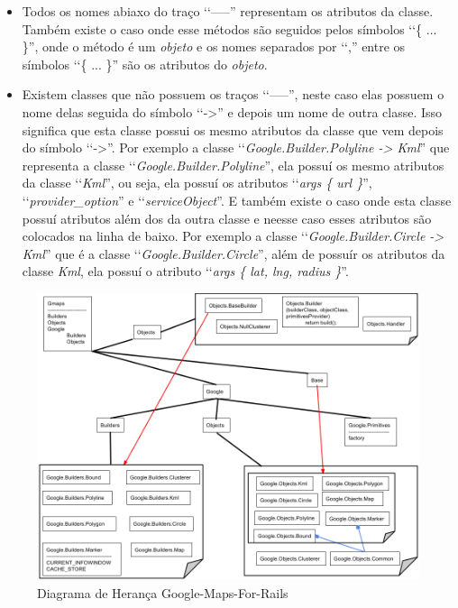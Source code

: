 \begin{itemize}
 
 \item Todos os nomes abiaxo do traço ‘‘-----'' representam os atributos da classe. Também 
 existe o caso onde esse métodos são seguidos pelos símbolos ‘‘\{ ... \}'', onde o método é um 
 \emph{objeto} e os nomes separados por ‘‘,'' entre os símbolos ‘‘\{ ... \}'' são os atributos
 do \emph{objeto}.
 
 \item Existem classes que não possuem os traços ‘‘-----'', neste caso elas possuem o nome delas
 seguida do símbolo ‘‘->'' e depois um nome de outra classe. Isso significa que esta classe 
 possui os mesmo atributos da classe que vem depois do símbolo ‘‘->''. Por exemplo a 
 classe ‘‘\emph{Google.Builder.Polyline -> Kml}'' que representa a classe 
 ‘‘\emph{Google.Builder.Polyline}'', ela possuí os mesmo atributos da classe
 ‘‘\emph{Kml}'', ou seja, ela possuí os atributos 
 ‘‘\emph{args \{ url \}}'', ‘‘\emph{provider\_option}'' e ‘‘\emph{serviceObject}''. E também existe o caso 
 onde esta classe possuí atributos além dos da outra classe e neesse caso esses 
 atributos são colocados na linha de baixo. Por exemplo a classe 
 ‘‘\emph{Google.Builder.Circle -> Kml}'' que é a classe ‘‘\emph{Google.Builder.Circle}'', além de 
 possuír os atributos da classe \emph{Kml}, ela possuí o atributo 
 ‘‘\emph{args \{ lat, lng, radius \}}''.
 
\end{itemize}

\begin{figure}[ht]
  \includegraphics[scale=0.48]{images/diagrama_de_heranca_google_maps_for_rails.png}
  \caption{Diagrama de Herança Google-Maps-For-Rails}
  \label{fig:diagrama_de_heranca_google_maps_for_rails}
\end{figure}

